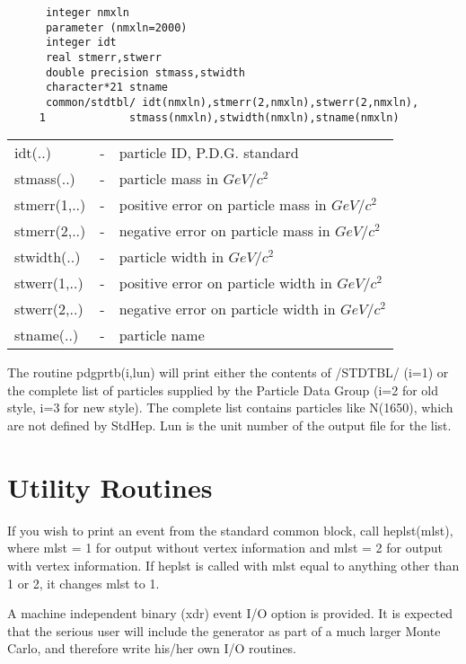 \begin{verbatim}
      integer nmxln
      parameter (nmxln=2000)
      integer idt
      real stmerr,stwerr
      double precision stmass,stwidth
      character*21 stname
      common/stdtbl/ idt(nmxln),stmerr(2,nmxln),stwerr(2,nmxln),
     1             stmass(nmxln),stwidth(nmxln),stname(nmxln)
\end{verbatim}
\begin{center}
\begin{tabular}{lcl}
idt(..)     &-&particle ID, P.D.G. standard \\
stmass(..)  &-&particle mass in $GeV/c^2$ \\
stmerr(1,..)&-&positive error on particle mass in $GeV/c^2$ \\
stmerr(2,..)&-&negative error on particle mass in $GeV/c^2$ \\
stwidth(..) &-&particle width in $GeV/c^2$ \\
stwerr(1,..)&-&positive error on particle width in $GeV/c^2$ \\
stwerr(2,..)&-&negative error on particle width in $GeV/c^2$ \\ 
stname(..)  &-&particle name \\
\end{tabular}
\end{center}

The routine pdgprtb(i,lun) will print either the contents of /STDTBL/ 
(i=1) or the complete list of particles supplied by the Particle 
Data Group (i=2 for old style, i=3 for new style).  
The complete list contains particles like N(1650), 
which are not defined by StdHep.
Lun is the unit number of the output file for the list.

\section { Utility Routines }

If you wish to print an event from the standard common block, call 
heplst(mlst), where mlst = 1 for output without vertex information and
mlst = 2 for output with vertex information.  If heplst is
called with mlst equal to anything other than 1 or 2, it changes mlst to 1.

A machine independent binary (xdr) event I/O option is provided.
It is expected that the serious user
will include the generator as part of a much larger Monte Carlo, and
therefore write his/her own I/O routines.  

